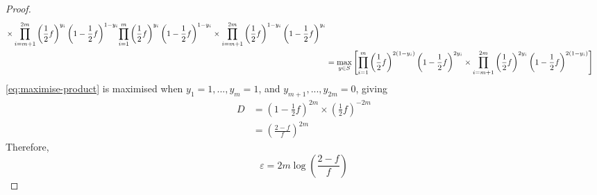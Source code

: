 \documentclass{article}
\begin{document}
\begin{proof}
\begin{align}
{				\times \prod\limits_{i=m+1}^{2m}\left(\frac{1}{2}f\right)^{y_i} \left(1-\frac{1}{2}f\right)^{1-y_i}%
			}{%
				\prod\limits_{i=1}^m \left(\frac{1}{2}f\right)^{y_i}\left(1-\frac{1}{2}f\right)^{1-y_i}%
				\times \prod\limits_{i=m+1}^{2m}\left(\frac{1}{2}f\right)^{1-y_i} \left(1-\frac{1}{2}f\right)^{y_i}%
			}\\ \label{eq:maximise-product}
			&=\max_{y\in S}\left[%
				\prod\limits_{i=1}^m \left(\frac{1}{2}f\right)^{2(1-y_i)}\left(1-\frac{1}{2}f\right)^{2y_i}%
				\times \prod\limits_{i=m+1}^{2m}\left(\frac{1}{2}f\right)^{2y_i} \left(1-\frac{1}{2}f\right)^{2(1-y_i)}\right]%
	\end{align}
	\ref{eq:maximise-product} is maximised when $y_1=1,...,y_m=1$, and $y_{m+1},...,y_{2m}=0$, giving
	\begin{align}
		D &= \left(1-\frac{1}{2}f\right)^{2m}\times\left(\frac{1}{2}f\right)^{-2m}\\
			&= \left(\frac{2-f}{f}\right)^{2m}
	\end{align}
	Therefore,
	\begin{equation}
		\varepsilon = 2m\log\left(\frac{2-f}{f}\right)
	\end{equation}
\end{proof}




\end{document}
